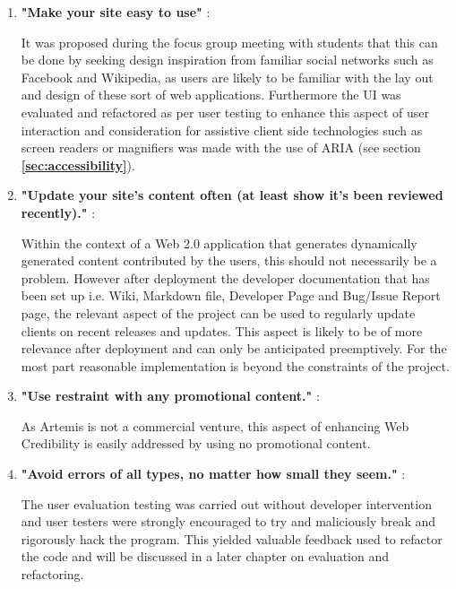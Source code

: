 \begin{enumerate}
    \item \textbf{"Make your site easy to use"} \cite{Fogg2002a}:
    
    It was proposed during the focus group meeting with students that this can be done by seeking design inspiration from familiar social networks such as Facebook and Wikipedia, as users are likely to be familiar with the lay out and design of these sort of web applications\cite{Fogg2002a}. Furthermore the UI was evaluated and refactored as per user testing to enhance this aspect of user interaction and consideration  for assistive client side technologies such as screen readers or magnifiers was made with the use of ARIA (see section \textbf{\ref{sec:accessibility}}).
    
    \item \textbf{"Update your site's content often (at least show it's been reviewed recently)."} \cite{Fogg2002a}:
    
    Within the context of a Web 2.0 application that generates dynamically generated content contributed by the users, this should not necessarily be a problem. However after deployment the developer documentation that has been set up i.e. Wiki, Markdown file, Developer Page and Bug/Issue Report page, the relevant aspect of the project can be used to regularly update clients on recent releases and updates. This aspect is likely to be of more relevance after deployment and can only be anticipated preemptively. For the most part reasonable implementation is beyond the constraints of the project.
    
    \item \textbf{"Use restraint with any promotional content."} \cite{Fogg2002a}:
    
    As Artemis is not a commercial venture, this aspect of enhancing Web Credibility is easily addressed by using no promotional content.
    
    \item \textbf{"Avoid errors of all types, no matter how small they seem."} \cite{Fogg2002a}:
    \label{avoidError}
    
    The user evaluation testing was carried out without developer intervention and user testers were strongly encouraged to try and maliciously break and rigorously hack the program. This yielded valuable feedback used to refactor the code and will be discussed in a later chapter on evaluation and refactoring.
    
\end{enumerate}
\newpage



